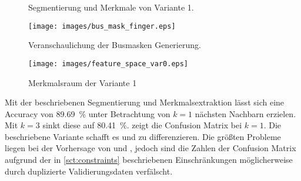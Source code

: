 \begin{figure}[ht]
    \caption{Segmentierung und Merkmale von Variante 1.\label{fig:segmentation_var0}}
\end{figure}

\begin{figure}[ht]
    \centering
    \texttt{[image: images/bus\_mask\_finger.eps]}
    \caption{Veranschaulichung der Busmasken Generierung.\label{fig:bus_mask_finger}}
\end{figure}

\begin{figure}[ht]
    \centering
    \texttt{[image: images/feature\_space\_var0.eps]}
    \caption{Merkmalsraum der Variante 1\label{fig:feature_space_var0}}
\end{figure}

Mit der beschriebenen Segmentierung und Merkmalsextraktion lässt sich eine \foreignlanguage{english}{Accuracy} von \SI{89.69}{\percent} unter Betrachtung von \(k = 1\) nächsten Nachbarn erzielen. Mit \(k = 3\) sinkt diese auf \SI{80.41}{\percent}.  zeigt die \foreignlanguage{english}{Confusion Matrix} bei \(k = 1\). Die beschriebene Variante schafft es  und  zu differenzieren. Die größten Probleme liegen bei der Vorhersage von  und , jedoch sind die Zahlen der \foreignlanguage{english}{Confusion Matrix} aufgrund der in \cref{sct:constraints} beschriebenen Einschränkungen möglicherweise durch duplizierte Validierungsdaten verfälscht.

